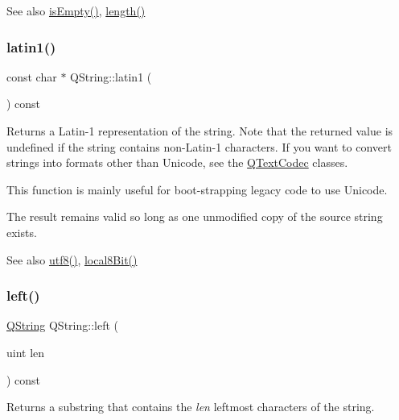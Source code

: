 \begin{DoxySeeAlso}{See also}
\mbox{\hyperlink{class_q_string_aa032d4b5892338beb575a85e59bbbf38}{is\+Empty()}}, \mbox{\hyperlink{class_q_string_ac431a733d01111059c8364c62ed53270}{length()}} 
\end{DoxySeeAlso}
\mbox{\label{class_q_string_af9cb186d8ba117c42f31e8235478fe68}} 
\subsubsection{\texorpdfstring{latin1()}{latin1()}}
{\footnotesize\ttfamily const char $\ast$ Q\+String\+::latin1 (\begin{DoxyParamCaption}{ }\end{DoxyParamCaption}) const}

Returns a Latin-\/1 representation of the string. Note that the returned value is undefined if the string contains non-\/\+Latin-\/1 characters. If you want to convert strings into formats other than Unicode, see the \mbox{\hyperlink{class_q_text_codec}{Q\+Text\+Codec}} classes.

This function is mainly useful for boot-\/strapping legacy code to use Unicode.

The result remains valid so long as one unmodified copy of the source string exists.

\begin{DoxySeeAlso}{See also}
\mbox{\hyperlink{class_q_string_a6da42912db630af419d216aa0d321ebd}{utf8()}}, \mbox{\hyperlink{class_q_string_ac8aa3324210f474d9f515ba9f80b0f68}{local8\+Bit()}} 
\end{DoxySeeAlso}
\mbox{\label{class_q_string_a02545407c8e65afbf6bd22324f9ed517}} 
\subsubsection{\texorpdfstring{left()}{left()}}
{\footnotesize\ttfamily \mbox{\hyperlink{class_q_string}{Q\+String}} Q\+String\+::left (\begin{DoxyParamCaption}\item[{uint}]{len }\end{DoxyParamCaption}) const}

Returns a substring that contains the {\itshape len} leftmost characters of the string.

